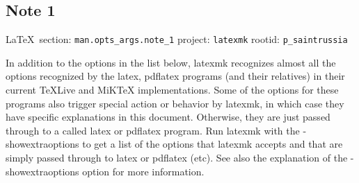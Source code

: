  
 
\subsection{Note 1}
  
\vspace{0.5cm}
 {\ifDEBUG\small\LaTeX~section: \verb|man.opts_args.note_1| project: \verb|latexmk| rootid: \verb|p_saintrussia| \fi}
\vspace{0.5cm}

In addition to the options in the list  below,  latexmk  recognizes almost all
the options recognized by the latex, pdflatex programs (and their relatives) in
their current TeXLive and  MiKTeX  implementations.  Some of the options for
these programs also trigger special action or behavior by latexmk, in which
case they have specific  explanations  in  this document.  Otherwise, they are
just passed through to a called latex or pdflatex program.  Run latexmk  with
the  -showextraoptions  to  get  a list of the options that latexmk accepts and
that are simply passed through to latex or pdflatex (etc).  See also the
explanation of the -showextraoptions option for more information.

